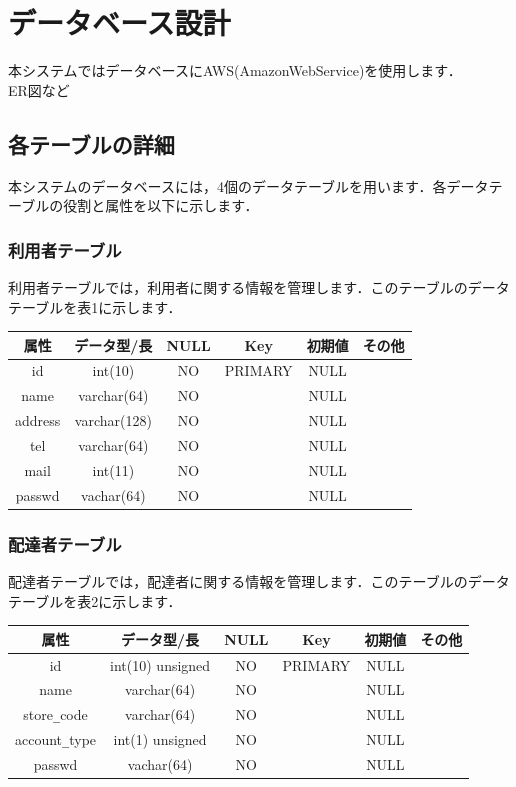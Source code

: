 \documentclass[a4j,titlepage]{jarticle}
\begin{document}
\section{データベース設計}
本システムではデータベースにAWS(AmazonWebService)を使用します．\\
ER図など
\subsection{各テーブルの詳細}
本システムのデータベースには，4個のデータテーブルを用います．各データテーブルの役割と属性を以下に示します．
\subsubsection{利用者テーブル}
利用者テーブルでは，利用者に関する情報を管理します．このテーブルのデータテーブルを表1に示します．
\begin{table}[htb]
  \begin{center}
    \begin{tabular}{|c|c|c|c|c|c|} \hline
      属性 & データ型/長 & NULL & Key & 初期値 & その他 \\ \hline \hline
      id & int(10) & NO & PRIMARY & NULL & \\ \hline
      name & varchar(64) & NO &   & NULL & \\ \hline
      address & varchar(128) & NO &   & NULL & \\ \hline
      tel & varchar(64) & NO &   & NULL & \\ \hline
      mail & int(11) & NO &   & NULL & \\ \hline
      passwd & vachar(64) & NO &   & NULL & \\ \hline
    \end{tabular}
  \end{center}
\end{table}

\subsubsection{配達者テーブル}
配達者テーブルでは，配達者に関する情報を管理します．このテーブルのデータテーブルを表2に示します．
\begin{table}[htb]
  \begin{center}
    \begin{tabular}{|c|c|c|c|c|c|} \hline
      属性 & データ型/長 & NULL & Key & 初期値 & その他 \\ \hline \hline
      id & int(10) unsigned & NO & PRIMARY & NULL & \\ \hline
      name & varchar(64) & NO &   & NULL & \\ \hline
      store\verb|_|code & varchar(64) & NO &   & NULL & \\ \hline
      account\verb|_|type & int(1) unsigned & NO &   & NULL & \\ \hline
      passwd & vachar(64) & NO &   & NULL & \\ \hline
    \end{tabular}
  \end{center}
\end{table}
\end{document}
